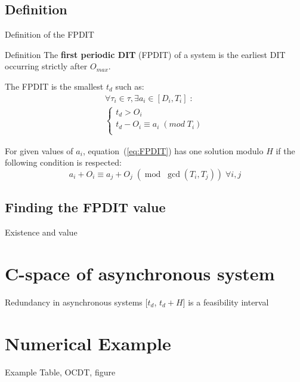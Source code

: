 \documentclass{beamer}
\begin{document}
	\subsection{Definition}

	\begin{frame}{Definition of the FPDIT}
		\begin{block}{Definition}
			The \textbf{first periodic DIT} (FPDIT) of a system is the earliest DIT occurring
			strictly after $O_{max}$.
		\end{block}

        The FPDIT is the smallest $t_d$ such as:
       \begin{equation}
            \begin{array}{l}
                \forall \tau_i \in \tau, \exists a_i \in [D_i,T_i] \; :\\
                \left\{
                    \begin{array}{l}
                        t_d > O_i \\
                        t_d - O_i \equiv a_i \; (mod \; T_i)
                        \\
                    \end{array}
                \right.
            \end{array}
            \label{eq:FPDIT}
        \end{equation}

        For given values of $a_i$, equation~(\ref{eq:FPDIT}) has one solution modulo $H$ if the following condition is respected:
        \[
            a_i + O_i \equiv a_j + O_j \; (\operatorname{mod} \; \operatorname{gcd}(T_i,
            T_j)) \; \forall i,j
        \]

	\end{frame}

	\subsection{Finding the FPDIT value}



	\begin{frame}{Existence and value}


	\end{frame}

\section{C-space of asynchronous system}

	\begin{frame}{Redundancy in asynchronous systems}
		[$t_d$, $t_d + H$] is a feasibility interval
	\end{frame}

\section{Numerical Example}

	\begin{frame}{Example}
		Table, OCDT, figure
	\end{frame}




\end{document}
